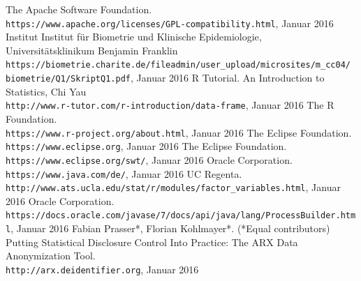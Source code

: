 \documentclass[a4paper, 12pt]{report} %
\begin{document}
%
\begin{thebibliography}{9} %
 

The Apache Software Foundation. \\
\texttt{https://www.apache.org/licenses/GPL-compatibility.html}, Januar 2016
Institut Institut für Biometrie und Klinische Epidemiologie,\\
Universitätsklinikum Benjamin Franklin \\
\texttt{https://biometrie.charite.de/fileadmin/user\_upload/microsites/m\_cc04/ biometrie/Q1/SkriptQ1.pdf}, Januar 2016
R Tutorial. An Introduction to Statistics, Chi Yau \\
\texttt{http://www.r-tutor.com/r-introduction/data-frame}, Januar 2016
The R Foundation.\\
\texttt{https://www.r-project.org/about.html}, Januar 2016
The Eclipse Foundation. \\
\texttt{https://www.eclipse.org}, Januar 2016
The Eclipse Foundation. \\
\texttt{https://www.eclipse.org/swt/}, Januar 2016
Oracle Corporation. \\
\texttt{https://www.java.com/de/}, Januar 2016
UC Regenta. \\
\texttt{http://www.ats.ucla.edu/stat/r/modules/factor\_variables.html}, Januar 2016
Oracle Corporation. \\
\texttt{https://docs.oracle.com/javase/7/docs/api/java/lang/ProcessBuilder.html}, Januar 2016
Fabian Prasser*, Florian Kohlmayer*. (*Equal contributors)\\
Putting Statistical Disclosure Control Into Practice: The ARX Data Anonymization Tool.\\\texttt{http://arx.deidentifier.org}, Januar 2016



\end{thebibliography}
\end{document}

